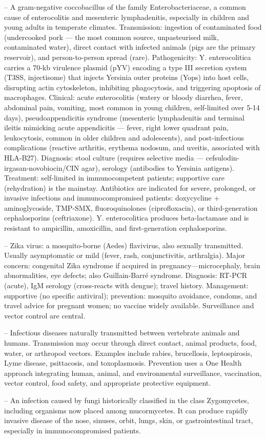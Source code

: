 -- A gram-negative coccobacillus of the family Enterobacteriaceae, a common cause of enterocolitis and mesenteric lymphadenitis, especially in children and young adults in temperate climates. Transmission: ingestion of contaminated food (undercooked pork — the most common source, unpasteurised milk, contaminated water), direct contact with infected animals (pigs are the primary reservoir), and person-to-person spread (rare). Pathogenicity: Y. enterocolitica carries a 70-kb virulence plasmid (pYV) encoding a type III secretion system (T3SS, injectisome) that injects Yersinia outer proteins (Yops) into host cells, disrupting actin cytoskeleton, inhibiting phagocytosis, and triggering apoptosis of macrophages. Clinical: acute enterocolitis (watery or bloody diarrhea, fever, abdominal pain, vomiting, most common in young children, self-limited over 5-14 days), pseudoappendicitis syndrome (mesenteric lymphadenitis and terminal ileitis mimicking acute appendicitis — fever, right lower quadrant pain, leukocytosis, common in older children and adolescents), and post-infectious complications (reactive arthritis, erythema nodosum, and uveitis, associated with HLA-B27). Diagnosis: stool culture (requires selective media — cefsulodin-irgasan-novobiocin/CIN agar), serology (antibodies to Yersinia antigens). Treatment: self-limited in immunocompetent patients; supportive care (rehydration) is the mainstay. Antibiotics are indicated for severe, prolonged, or invasive infections and immunocompromised patients: doxycycline + aminoglycoside, TMP-SMX, fluoroquinolones (ciprofloxacin), or third-generation cephalosporins (ceftriaxone). Y. enterocolitica produces beta-lactamase and is resistant to ampicillin, amoxicillin, and first-generation cephalosporins.

-- Zika virus: a mosquito-borne (Aedes) flavivirus, also sexually transmitted. Usually asymptomatic or mild (fever, rash, conjunctivitis, arthralgia). Major concern: congenital Zika syndrome if acquired in pregnancy—microcephaly, brain abnormalities, eye defects; also Guillain-Barré syndrome. Diagnosis: RT-PCR (acute), IgM serology (cross-reacts with dengue); travel history. Management: supportive (no specific antiviral); prevention: mosquito avoidance, condoms, and travel advice for pregnant women; no vaccine widely available. Surveillance and vector control are central.

-- Infectious diseases naturally transmitted between vertebrate animals and humans. Transmission may occur through direct contact, animal products, food, water, or arthropod vectors. Examples include rabies, brucellosis, leptospirosis, Lyme disease, psittacosis, and toxoplasmosis. Prevention uses a One Health approach integrating human, animal, and environmental surveillance, vaccination, vector control, food safety, and appropriate protective equipment.

-- An infection caused by fungi historically classified in the class Zygomycetes, including organisms now placed among mucormycetes. It can produce rapidly invasive disease of the nose, sinuses, orbit, lungs, skin, or gastrointestinal tract, especially in immunocompromised patients.
